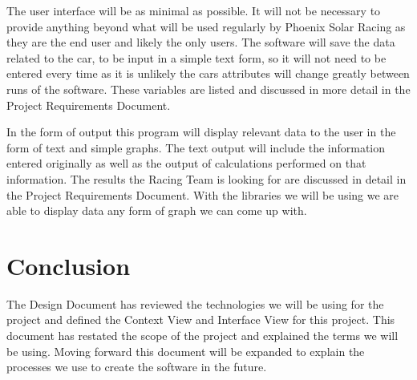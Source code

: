 \documentclass[onecolumn, draftclsnofoot,10pt, compsoc]{IEEEtran}
\begin{document}
The user interface will be as minimal as possible.
It will not be necessary to provide anything beyond what will be used regularly by Phoenix Solar Racing as they are the end user and likely the only users.
The software will save the data related to the car, to be input in a simple text form, so it will not need to be entered every time as it is unlikely the cars attributes will change greatly between runs of the software. 
These variables are listed and discussed in more detail in the Project Requirements Document.

In the form of output this program will display relevant data to the user in the form of text and simple graphs. 
The text output will include the information entered originally as well as the output of calculations performed on that information. 
The results the Racing Team is looking for are discussed in detail in the Project Requirements Document.
With the libraries we will be using we are able to display data any form of graph we can come up with. 

\section{Conclusion}
The Design Document has reviewed the technologies we will be using for the project and defined the Context View and Interface View for this project.
This document has restated the scope of the project and explained the terms we will be using. 
Moving forward this document will be expanded to explain the processes we use to create the software in the future.



\end{document}
